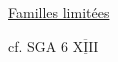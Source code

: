 \begin{flushright}
\uline{Familles limitées}

cf. SGA 6 $\overline{\underline{\mathrm{XIII}}}$
\end{flushright}
